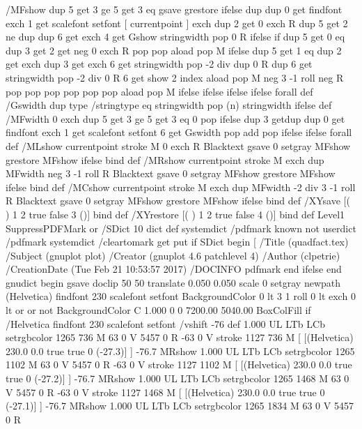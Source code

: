 /MFshow {
   { dup 5 get 3 ge
     { 5 get 3 eq {gsave} {grestore} ifelse }
     {dup dup 0 get findfont exch 1 get scalefont setfont
     [ currentpoint ] exch dup 2 get 0 exch R dup 5 get 2 ne {dup dup 6
     get exch 4 get {Gshow} {stringwidth pop 0 R} ifelse }if dup 5 get 0 eq
     {dup 3 get {2 get neg 0 exch R pop} {pop aload pop M} ifelse} {dup 5
     get 1 eq {dup 2 get exch dup 3 get exch 6 get stringwidth pop -2 div
     dup 0 R} {dup 6 get stringwidth pop -2 div 0 R 6 get
     show 2 index {aload pop M neg 3 -1 roll neg R pop pop} {pop pop pop
     pop aload pop M} ifelse }ifelse }ifelse }
     ifelse }
   forall} def
/Gswidth {dup type /stringtype eq {stringwidth} {pop (n) stringwidth} ifelse} def
/MFwidth {0 exch { dup 5 get 3 ge { 5 get 3 eq { 0 } { pop } ifelse }
 {dup 3 get{dup dup 0 get findfont exch 1 get scalefont setfont
     6 get Gswidth pop add} {pop} ifelse} ifelse} forall} def
/MLshow { currentpoint stroke M
  0 exch R
  Blacktext {gsave 0 setgray MFshow grestore} {MFshow} ifelse } bind def
/MRshow { currentpoint stroke M
  exch dup MFwidth neg 3 -1 roll R
  Blacktext {gsave 0 setgray MFshow grestore} {MFshow} ifelse } bind def
/MCshow { currentpoint stroke M
  exch dup MFwidth -2 div 3 -1 roll R
  Blacktext {gsave 0 setgray MFshow grestore} {MFshow} ifelse } bind def
/XYsave    { [( ) 1 2 true false 3 ()] } bind def
/XYrestore { [( ) 1 2 true false 4 ()] } bind def
Level1 SuppressPDFMark or 
{} {
/SDict 10 dict def
systemdict /pdfmark known not {
  userdict /pdfmark systemdict /cleartomark get put
} if
SDict begin [
  /Title (quadfact.tex)
  /Subject (gnuplot plot)
  /Creator (gnuplot 4.6 patchlevel 4)
  /Author (clpetrie)
  /CreationDate (Tue Feb 21 10:53:57 2017)
  /DOCINFO pdfmark
end
} ifelse
end
gnudict begin
gsave
doclip
50 50 translate
0.050 0.050 scale
0 setgray
newpath
(Helvetica) findfont 230 scalefont setfont
BackgroundColor 0 lt 3 1 roll 0 lt exch 0 lt or or not {BackgroundColor C 1.000 0 0 7200.00 5040.00 BoxColFill} if
/Helvetica findfont 230 scalefont setfont
/vshift -76 def
1.000 UL
LTb
LCb setrgbcolor
1265 736 M
63 0 V
5457 0 R
-63 0 V
stroke
1127 736 M
[ [(Helvetica) 230.0 0.0 true true 0 (-27.3)]
] -76.7 MRshow
1.000 UL
LTb
LCb setrgbcolor
1265 1102 M
63 0 V
5457 0 R
-63 0 V
stroke
1127 1102 M
[ [(Helvetica) 230.0 0.0 true true 0 (-27.2)]
] -76.7 MRshow
1.000 UL
LTb
LCb setrgbcolor
1265 1468 M
63 0 V
5457 0 R
-63 0 V
stroke
1127 1468 M
[ [(Helvetica) 230.0 0.0 true true 0 (-27.1)]
] -76.7 MRshow
1.000 UL
LTb
LCb setrgbcolor
1265 1834 M
63 0 V
5457 0 R

